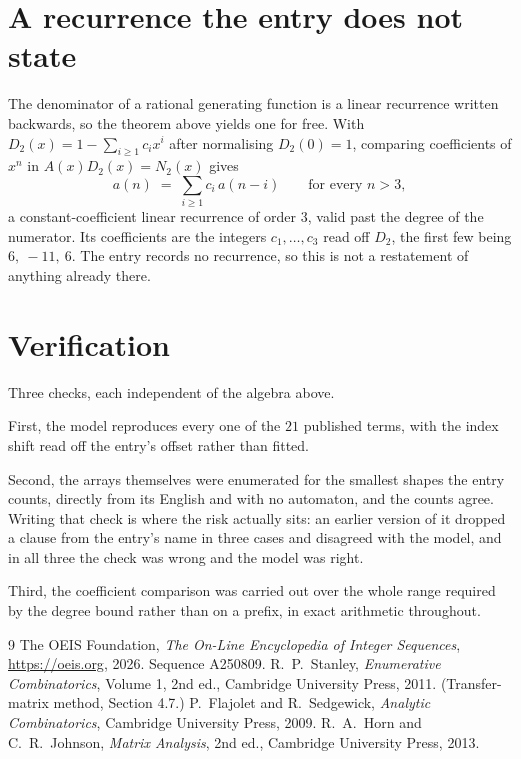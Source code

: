 \documentclass[11pt,a4paper]{article}
\theoremstyle{plain}
\theoremstyle{definition}
\begin{document}
\section{A recurrence the entry does not state}

The denominator of a rational generating function is a linear recurrence written backwards, so
the theorem above yields one for free. With $D_2(x)=1-\sum_{i\ge1}c_ix^i$ after normalising
$D_2(0)=1$, comparing coefficients of $x^n$ in $A(x)D_2(x)=N_2(x)$ gives
\[
a(n)\;=\;\sum_{i\ge1}c_i\,a(n-i)\qquad\text{for every }n>3,
\]
a constant-coefficient linear recurrence of order $3$, valid past the degree of the
numerator. Its coefficients are the integers $c_1,\dots,c_{3}$ read off $D_2$, the first few being $6,\ -11,\ 6$. The entry records no recurrence, so this is not a restatement of anything
already there.

\section{Verification}

Three checks, each independent of the algebra above.

First, the model reproduces every one of the $21$ published terms, with the index shift
read off the entry's offset rather than fitted.

Second, the arrays themselves were enumerated for the smallest shapes the entry counts,
directly from its English and with no automaton, and the counts agree. Writing that check is
where the risk actually sits: an earlier version of it dropped a clause from the entry's name
in three cases and disagreed with the model, and in all three the check was wrong and the model
was right.

Third, the coefficient comparison was carried out over the whole range required by the degree
bound rather than on a prefix, in exact arithmetic throughout.

\begin{thebibliography}{9}
 The OEIS Foundation, \emph{The On-Line Encyclopedia of Integer
Sequences}, \url{https://oeis.org}, 2026. Sequence A250809.
 R.~P.~Stanley, \emph{Enumerative Combinatorics}, Volume 1, 2nd ed.,
Cambridge University Press, 2011. (Transfer-matrix method, Section 4.7.)
 P.~Flajolet and R.~Sedgewick, \emph{Analytic Combinatorics}, Cambridge
University Press, 2009.
 R.~A.~Horn and C.~R.~Johnson, \emph{Matrix Analysis}, 2nd ed., Cambridge
University Press, 2013.
\end{thebibliography}
\end{document}
